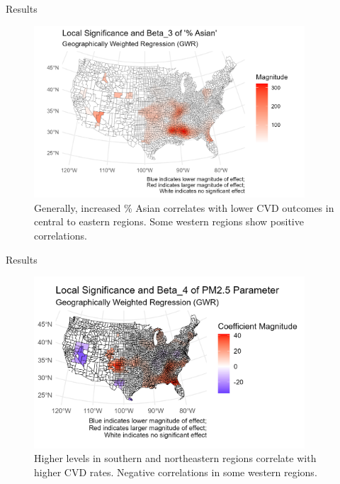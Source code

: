 \documentclass[
  ignorenonframetext,
]{beamer}
\begin{document}
\begin{frame}{Results}
\label{results-5}
\begin{figure}[H]

{\centering \includegraphics[width=0.9\textwidth,height=\textheight]{PresentationPhotos/asianplot.png}

}

\caption{Generally, increased \% Asian correlates with lower CVD
outcomes in central to eastern regions. Some western regions show
positive correlations.}

\end{figure}%
\end{frame}

\begin{frame}{Results}
\label{results-6}
\begin{figure}[H]

{\centering \includegraphics[width=0.9\textwidth,height=\textheight]{PresentationPhotos/pm25.png}

}

\caption{Higher levels in southern and northeastern regions correlate
with higher CVD rates. Negative correlations in some western regions.}

\end{figure}%
\end{frame}
\end{document}
